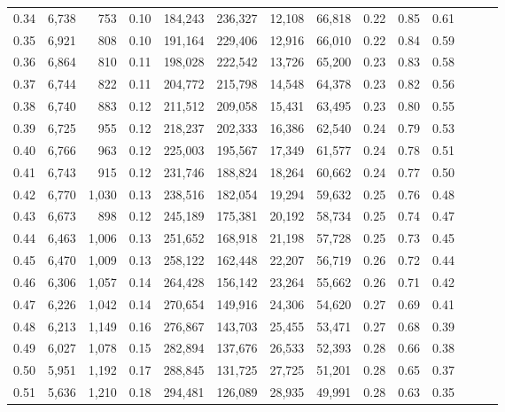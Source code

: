 \begin{tabular}{rrrrrrrrrrrrrr}
0.34 &   6,738 &    753 &  0.10 &  184,243 &  236,327 &  12,108 &  66,818 &  0.22 &  0.85 &      0.61 \\
0.35 &   6,921 &    808 &  0.10 &  191,164 &  229,406 &  12,916 &  66,010 &  0.22 &  0.84 &      0.59 \\
0.36 &   6,864 &    810 &  0.11 &  198,028 &  222,542 &  13,726 &  65,200 &  0.23 &  0.83 &      0.58 \\
0.37 &   6,744 &    822 &  0.11 &  204,772 &  215,798 &  14,548 &  64,378 &  0.23 &  0.82 &      0.56 \\
0.38 &   6,740 &    883 &  0.12 &  211,512 &  209,058 &  15,431 &  63,495 &  0.23 &  0.80 &      0.55 \\
0.39 &   6,725 &    955 &  0.12 &  218,237 &  202,333 &  16,386 &  62,540 &  0.24 &  0.79 &      0.53 \\
0.40 &   6,766 &    963 &  0.12 &  225,003 &  195,567 &  17,349 &  61,577 &  0.24 &  0.78 &      0.51 \\
0.41 &   6,743 &    915 &  0.12 &  231,746 &  188,824 &  18,264 &  60,662 &  0.24 &  0.77 &      0.50 \\
0.42 &   6,770 &  1,030 &  0.13 &  238,516 &  182,054 &  19,294 &  59,632 &  0.25 &  0.76 &      0.48 \\
0.43 &   6,673 &    898 &  0.12 &  245,189 &  175,381 &  20,192 &  58,734 &  0.25 &  0.74 &      0.47 \\
0.44 &   6,463 &  1,006 &  0.13 &  251,652 &  168,918 &  21,198 &  57,728 &  0.25 &  0.73 &      0.45 \\
0.45 &   6,470 &  1,009 &  0.13 &  258,122 &  162,448 &  22,207 &  56,719 &  0.26 &  0.72 &      0.44 \\
0.46 &   6,306 &  1,057 &  0.14 &  264,428 &  156,142 &  23,264 &  55,662 &  0.26 &  0.71 &      0.42 \\
0.47 &   6,226 &  1,042 &  0.14 &  270,654 &  149,916 &  24,306 &  54,620 &  0.27 &  0.69 &      0.41 \\
0.48 &   6,213 &  1,149 &  0.16 &  276,867 &  143,703 &  25,455 &  53,471 &  0.27 &  0.68 &      0.39 \\
0.49 &   6,027 &  1,078 &  0.15 &  282,894 &  137,676 &  26,533 &  52,393 &  0.28 &  0.66 &      0.38 \\
0.50 &   5,951 &  1,192 &  0.17 &  288,845 &  131,725 &  27,725 &  51,201 &  0.28 &  0.65 &      0.37 \\
0.51 &   5,636 &  1,210 &  0.18 &  294,481 &  126,089 &  28,935 &  49,991 &  0.28 &  0.63 &      0.35 \\

\end{tabular}
